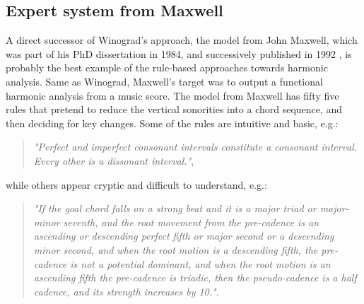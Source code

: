     \subsection{Expert system from Maxwell}
    A direct successor of Winograd's approach, the model from John Maxwell, which was part of his PhD dissertation in 1984, and successively published in 1992 \cite{maxwell1992expert}, is probably the best example of the rule-based approaches towards harmonic analysis. Same as Winograd, Maxwell's target was to output a functional harmonic analysis from a music score. The model from Maxwell has fifty five rules that pretend to reduce the vertical sonorities into a chord sequence, and then deciding for key changes. Some of the rules are intuitive and basic, e.g.:

    \begin{quote}
    \centering
    \emph{"Perfect and imperfect consonant intervals constitute a consonant interval. Every other is a dissonant interval."},
    \end{quote}

     while others appear cryptic and difficult to understand, e.g.:

     \begin{quote}
     \centering
     \emph{"If the goal chord falls on a strong beat and it is a major triad or major-minor seventh, and the root movement from the pre-cadence is an ascending or descending perfect fifth or major second or a descending minor second, and when the root motion is a descending fifth, the pre-cadence is not a potential dominant, and when the root motion is an ascending fifth the pre-cadence is triadic, then the pseudo-cadence is a half cadence, and its strength increases by 10."}.
     \end{quote}


